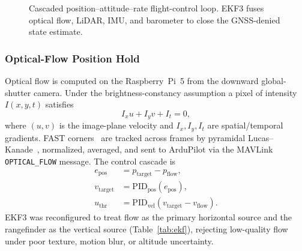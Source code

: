 \documentclass[journal]{IEEEtran}
\begin{document}
\begin{figure}[!t]
\centering
{}
\caption{Cascaded position--attitude--rate flight-control loop. EKF3 fuses optical
flow, LiDAR, IMU, and barometer to close the GNSS-denied state estimate.}
\label{fig:pid}
\end{figure}

\subsubsection{Optical-Flow Position Hold}
Optical flow is computed on the Raspberry~Pi~5 from the downward global-shutter
camera. Under the brightness-constancy assumption a pixel of intensity $I(x,y,t)$
satisfies
\begin{equation}
I_x u + I_y v + I_t = 0,
\label{eq:bcc}
\end{equation}
where $(u,v)$ is the image-plane velocity and $I_x,I_y,I_t$ are spatial/temporal
gradients. FAST corners~\cite{rosten2006fast} are tracked across frames by
pyramidal Lucas--Kanade~\cite{lucas1981iterative}, normalized, averaged, and sent
to ArduPilot via the MAVLink \texttt{OPTICAL\_FLOW} message. The control cascade is
\begin{align}
e_{\mathrm{pos}} &= p_{\mathrm{target}} - p_{\mathrm{flow}},\\
v_{\mathrm{target}} &= \mathrm{PID}_{\mathrm{pos}}(e_{\mathrm{pos}}),\\
u_{\mathrm{thr}} &= \mathrm{PID}_{\mathrm{vel}}(v_{\mathrm{target}} - v_{\mathrm{flow}}).
\end{align}
EKF3 was reconfigured to treat flow as the primary horizontal source and the
rangefinder as the vertical source (Table~\ref{tab:ekf}), rejecting low-quality
flow under poor texture, motion blur, or altitude uncertainty.
\end{document}
